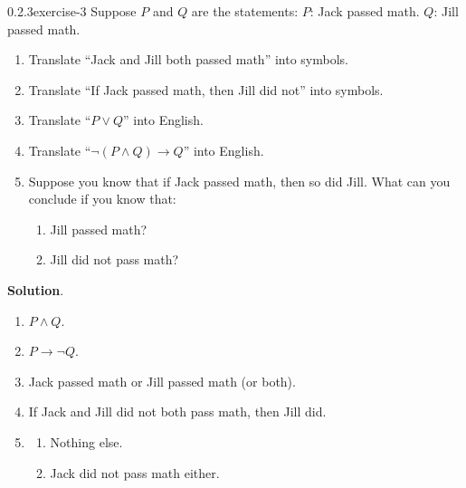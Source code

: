 \documentclass[twoside,11pt,]{book}
\numberwithin{equation}{chapter}
\newcommand{\imp}{\rightarrow}
\begin{document}
\begin{divisionsolution}{0.2.3}{}{exercise-3}%
\hypertarget{p-147}{}%
Suppose \(P\) and \(Q\) are the statements: \(P\): Jack passed math. \(Q\): Jill passed math.\leavevmode%
\begin{enumerate}[label=(\alph*)]
\item\hypertarget{li-75}{}\hypertarget{p-148}{}%
Translate ``Jack and Jill both passed math'' into symbols.%
\item\hypertarget{li-76}{}\hypertarget{p-149}{}%
Translate ``If Jack passed math, then Jill did not'' into symbols.%
\item\hypertarget{li-77}{}\hypertarget{p-150}{}%
Translate ``\(P \vee Q\)'' into English.%
\item\hypertarget{li-78}{}\hypertarget{p-151}{}%
Translate ``\(\neg(P \wedge Q) \imp Q\)'' into English.%
\item\hypertarget{li-79}{}\hypertarget{p-152}{}%
Suppose you know that if Jack passed math, then so did Jill. What can you conclude if you know that:%
\begin{enumerate}[label=\roman*.]
\item\hypertarget{li-80}{}Jill passed math?%
\item\hypertarget{li-81}{}Jill did not pass math?%
\end{enumerate}
%
\end{enumerate}
%
\par\smallskip%
\noindent\textbf{Solution}.\quad%
\hypertarget{p-153}{}%
\leavevmode%
\begin{enumerate}[label=(\alph*)]
\item\hypertarget{li-82}{}\(P \wedge Q\).%
\item\hypertarget{li-83}{}\(P \imp \neg Q\).%
\item\hypertarget{li-84}{}\hypertarget{p-154}{}%
Jack passed math or Jill passed math (or both).%
\item\hypertarget{li-85}{}\hypertarget{p-155}{}%
If Jack and Jill did not both pass math, then Jill did.%
\item\hypertarget{li-86}{}\hypertarget{p-156}{}%
%
\begin{enumerate}[label=\roman*.]
\item\hypertarget{li-87}{}Nothing else.%
\item\hypertarget{li-88}{}Jack did not pass math either.%
\end{enumerate}
%
\end{enumerate}
%
\end{divisionsolution}%
\end{document}
